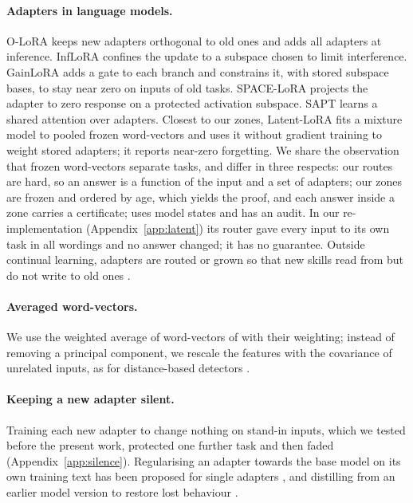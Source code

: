 \paragraph{Adapters in language models.} O-LoRA \citep{wang2023olora} keeps new adapters orthogonal to
old ones and adds all adapters at inference. InfLoRA \citep{liang2024inflora} confines the update to a
subspace chosen to limit interference. GainLoRA \citep{liang2025gainlora} adds a gate to each branch and constrains it, with stored subspace bases, to stay near zero on inputs of old tasks. SPACE-LoRA \citep{spacelora2026} projects the adapter to zero response on a protected
activation subspace. SAPT \citep{zhao2024sapt} learns a shared attention over adapters. Closest to our
zones, Latent-LoRA \citep{latentlora2026} fits a mixture model to pooled frozen word-vectors and uses it
without gradient training to weight stored adapters; it reports near-zero forgetting. We share the
observation that frozen word-vectors separate tasks, and differ in three respects: our routes are hard,
so an answer is a function of the input and a set of adapters; our zones are frozen and ordered by age,
which yields the proof, and each answer inside a zone carries a certificate; \recog{} uses model states
and has an audit. In our re-implementation (Appendix~\ref{app:latent}) its router gave every input to
its own task in all wordings and no answer changed; it has no guarantee. Outside continual learning, adapters are routed
\citep{lorauter2026,logo2025} or grown so that new skills read from but do not write to old ones
\citep{read2026}.

\paragraph{Averaged word-vectors.} We use the weighted average of word-vectors of \citet{arora2017simple}
with their weighting; instead of removing a principal component, we rescale the features with the
covariance of unrelated inputs, as for distance-based detectors \citep{lee2018mahalanobis}.

\paragraph{Keeping a new adapter silent.} Training each new adapter to change nothing on stand-in
inputs, which we tested before the present work, protected one further task and then faded (Appendix~\ref{app:silence}). Regularising an adapter
towards the base model on its own training text has been proposed for single adapters
\citep{maskthetarget2026}, and distilling from an earlier model version to restore lost behaviour
\citep{lu2025onpolicy}.
